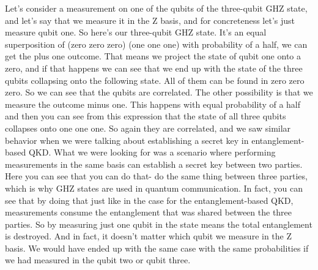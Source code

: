 Let's consider a measurement on one of the qubits of the three-qubit GHZ state, and let's say that we measure it in the Z basis, and for concreteness let's just measure qubit one. So here's our three-qubit GHZ state. It's an equal superposition of (zero zero zero) (one one one) with probability of a half, we can get the plus one outcome. That means we project the state of qubit one onto a zero, and if that happens we can see that we end up with the state of the three qubits collapsing onto the following state. All of them can be found in zero zero zero. So we can see that the qubits are correlated. The other possibility is that we measure the outcome minus one. This happens with equal probability of a half and then you can see from this expression that the state of all three qubits collapses onto one one one. So again they are correlated, and we saw similar behavior when we were talking about establishing a secret key in entanglement-based QKD. What we were looking for was a scenario where performing measurements in the same basis can establish a secret key between two parties. Here you can see that you can do that- do the same thing between three parties, which is why GHZ states are used in quantum communication. In fact, you can see that by doing that just like in the case for the entanglement-based QKD, measurements consume the entanglement that was shared between the three parties. So by measuring just one qubit in the state means the total entanglement is destroyed. And in fact, it doesn't matter which qubit we measure in the Z basis. We would have ended up with the same case with the same probabilities if we had measured in the qubit two or qubit three.

